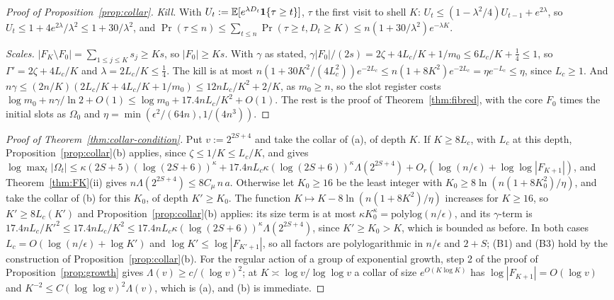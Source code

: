 \begin{proof}[Proof of Proposition~\ref{prop:collar}]
\emph{Kill.} With $U_t:=\mathbb E[e^{\lambda D_t}\mathbf 1\{\tau\ge t\}]$, $\tau$ the first visit to shell $K$: $U_t\le(1-\lambda^2/4)U_{t-1}+e^{2\lambda}$, so $U_t\le1+4e^{2\lambda}/\lambda^2\le1+30/\lambda^2$, and
$\Pr(\tau\le n)\le\sum_{t\le n}\Pr(\tau\ge t,D_t\ge K)\le n(1+30/\lambda^2)e^{-\lambda K}$.

\emph{Scales.} $|F_K\setminus F_0|=\sum_{1\le j\le K}s_j\ge Ks$, so $|F_0|\ge Ks$. With $\gamma$ as stated, $\gamma|F_0|/(2s)=2\zeta+4L_c/K+1/m_0\le6L_c/K+\frac14\le1$, so
$\Gamma'=2\zeta+4L_c/K$ and $\lambda=2L_c/K\le\frac14$. The kill is at most $n(1+30K^2/(4L_c^2))e^{-2L_c}\le n(1+8K^2)e^{-2L_c}=\eta e^{-L_c}\le\eta$, since $L_c\ge1$. And
$n\gamma\le(2n/K)(2L_c/K+4L_c/K+1/m_0)\le12nL_c/K^2+2/K$, as $m_0\ge n$, so the slot register costs $\log m_0+n\gamma/\ln2+O(1)\le\log m_0+17.4nL_c/K^2+O(1)$. The rest is the proof of
Theorem~\ref{thm:fibred}, with the core $F_0$ times the initial slots as $\Omega_0$ and $\eta=\min(\epsilon^2/(64n),1/(4n^3))$.
\end{proof}

\begin{proof}[Proof of Theorem~\ref{thm:collar-condition}]
Put $v:=2^{2S+4}$ and take the collar of (a), of depth $K$. If $K\ge8L_c$, with $L_c$ at this depth, Proposition~\ref{prop:collar}(b) applies, since $\zeta\le1/K\le L_c/K$, and gives
$\log\max_t|\Omega_t|\le\kappa(2S+5)(\log(2S+6))^\kappa+17.4nL_c\kappa(\log(2S+6))^\kappa\Lambda(2^{2S+4})+O_r(\log(n/\epsilon)+\log\log|F_{K+1}|)$, and
Theorem~\ref{thm:FK}(ii) gives $n\Lambda(2^{2S+4})\le8C_\mu\,n\,a$. Otherwise let $K_0\ge16$ be the least integer with $K_0\ge8\ln(n(1+8K_0^2)/\eta)$, and take the collar of (b)
for this $K_0$, of depth $K'\ge K_0$. The function $K\mapsto K-8\ln(n(1+8K^2)/\eta)$ increases for $K\ge16$, so $K'\ge8L_c(K')$ and Proposition~\ref{prop:collar}(b) applies: its size
term is at most $\kappa K_0^\kappa=\mathrm{polylog}(n/\epsilon)$, and its $\gamma$-term is $17.4nL_c/K'^2\le17.4nL_c/K^2\le17.4nL_c\kappa(\log(2S+6))^\kappa\Lambda(2^{2S+4})$, since
$K'\ge K_0>K$, which is bounded as before. In both cases $L_c=O(\log(n/\epsilon)+\log K')$ and $\log K'\le\log|F_{K'+1}|$, so all factors are polylogarithmic in $n/\epsilon$ and
$2+S$; (B1) and (B3) hold by the construction of Proposition~\ref{prop:collar}(b). For the regular action of a group of exponential growth, step 2 of the proof of
Proposition~\ref{prop:growth} gives $\Lambda(v)\ge c/(\log v)^2$; at $K\asymp\log v/\log\log v$ a collar of size $e^{O(K\log K)}$ has $\log|F_{K+1}|=O(\log v)$ and
$K^{-2}\le C(\log\log v)^2\Lambda(v)$, which is (a), and (b) is immediate.
\end{proof}

